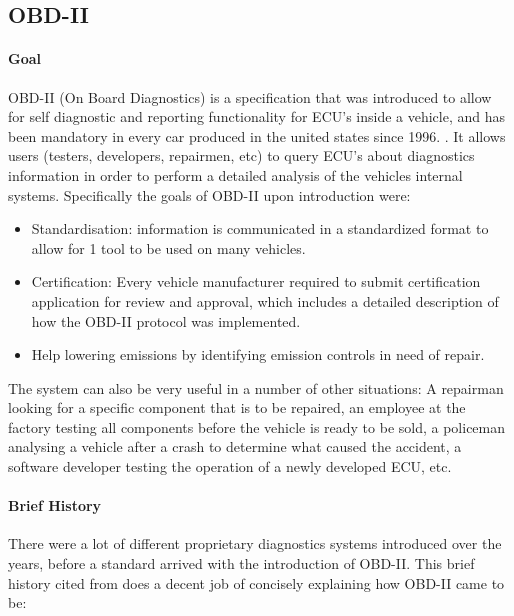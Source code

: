 \documentclass[master=cws,masteroption=vs,english]{kulemt}
\begin{document}
\subsection{OBD-II}
\label{sec:obd}

\paragraph{Goal} OBD-II (On Board Diagnostics) is a specification that was introduced to allow for self diagnostic and reporting functionality for ECU's inside a vehicle, and has been mandatory in every car produced in the united states since 1996. \cite{wiki:OBD}. It allows users (testers, developers, repairmen, etc) to query ECU's about diagnostics information in order to perform a detailed analysis of the vehicles internal systems. Specifically the goals of OBD-II upon introduction were: 
\begin{itemize}
	\item Standardisation: information is communicated in a standardized format to allow for 1 tool to be used on many vehicles.
	\item Certification: Every vehicle manufacturer required to submit certification application for review and approval, which includes a detailed description of how the OBD-II protocol was implemented.
	\item Help lowering emissions by identifying emission controls in need of repair.
\end{itemize} 

The system can also be very useful in a number of other situations: A repairman looking for a specific component that is to be repaired, an employee at the factory testing all components before the vehicle is ready to be sold, a policeman analysing a vehicle after a crash to determine what caused the accident, a software developer testing the operation of a newly developed ECU, etc. 
\newline

\paragraph{Brief History} 

There were a lot of different proprietary diagnostics systems introduced over the years, before a standard arrived with the introduction of OBD-II. This brief history cited from \cite{OBDhistory} does a decent job of concisely explaining how OBD-II came to be:
\end{document}
